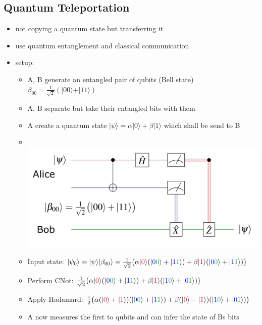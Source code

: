 \documentclass[12pt,a4paper]{article}
\newcommand{\ket}[1]{\vert #1 \rangle}
\newcommand{\red}[1]{\textcolor{red} {#1}}
\newcommand{\blue}[1]{\textcolor{blue} {#1}}
\newcommand{\green}[1]{\textcolor{Green} {#1}}
\begin{document}
\subsection{Quantum Teleportation}
\begin{itemize}
\item not copying a quantum state but transferring it
\item use quantum entanglement and classical communication
\item setup:
\begin{itemize}
\item A, B generate an entangled pair of qubits (Bell state) $\beta_{00} = \frac{1}{\sqrt{2}}(\ket{00}+\ket{11})$
\item A, B separate but take their entangled bits with them
\item A create a quantum state $\ket{\psi} = \alpha \ket{0} + \beta\ket{1}$ which shall be send to B
\item \hspace{1pt}\\\includegraphics[scale=0.4]{./resources/qtele.png}
\item Input state: $\ket{\psi_0}=\ket{\psi}\ket{\beta_{00}} = \frac{1}{\sqrt{2}}\big( \alpha\ket{\red{0}}(\ket{\blue{0}\green{0}}+\ket{\blue{1}\green{1}})+\beta\ket{\red{1}}(\ket{\blue{0}\green{0}}+\ket{\blue{1}\green{1}} )\big)$
\item Perform CNot: $\frac{1}{\sqrt{2}}\big( \alpha\ket{\red{0}}(\ket{\blue{0}\green{0}}+\ket{\blue{1}\green{1}})+\beta\ket{\red{1}}(\ket{\blue{1}\green{0}}+\ket{\blue{0}\green{1}} )\big)$
\item Apply Hadamard: $\frac{1}{2}\big( \alpha(\ket{\red{0}}+\ket{\red{1}})(\ket{\blue{0}\green{0}}+\ket{\blue{1}\green{1}})+\beta(\ket{\red{0}}-\ket{\red{1}})(\ket{\blue{1}\green{0}}+\ket{\blue{0}\green{1}})\big)$
\item A now measures the first to qubits and can infer the state of Bs bits
\begin{itemize}

\end{itemize}
\end{itemize}
\end{itemize}
\end{document}
